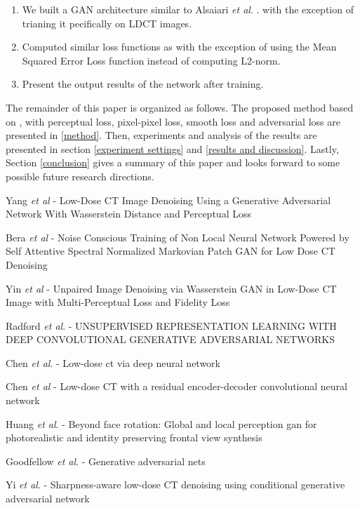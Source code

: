 \documentclass[journal]{IEEEtran}
\begin{document}
	\begin{enumerate}
		\item We built a GAN architecture similar to Alsaiari \emph{et al}. \cite{alsaiari2019image}. with the exception of trianing it pecifically on LDCT images.
		\item Computed similar loss functions as \cite{alsaiari2019image} with the exception of using the Mean Squared Error Loss function instead of computing L2-norm.
		\item Present the output results of the network after training.
	\end{enumerate}
	
	The remainder of this paper is organized as follows.  The proposed method based on \cite{alsaiari2019image}, with perceptual loss, pixel-pixel loss, smooth loss and adversarial loss are presented in \ref{method}.  Then, experiments and analysis of the results are presented in section \ref{experiment settings} and \ref{results and discussion}.  Lastly, Section \ref{conclusion} gives a summary of this paper and looks forward to some possible future research directions.


\cite{8340157} Yang \emph{et al} - Low-Dose CT Image Denoising Using a Generative Adversarial Network With Wasserstein Distance and Perceptual Loss

\cite{9474492} Bera \emph{et al} - Noise Conscious Training of Non Local Neural Network Powered by Self Attentive Spectral Normalized Markovian Patch GAN for Low Dose CT Denoising

\cite{yin2021unpaired} Yin \emph{et al} - Unpaired Image Denoising via Wasserstein GAN in Low-Dose CT Image with Multi-Perceptual Loss and Fidelity Loss

\cite{radford2015unsupervised} Radford \emph{et al}. - UNSUPERVISED REPRESENTATION LEARNING WITH DEEP CONVOLUTIONAL GENERATIVE ADVERSARIAL NETWORKS

\cite{chen2017low} Chen \emph{et al}. - Low-dose ct via deep neural network

\cite{chen2017low2} Chen \emph{et al} - Low-dose CT with a residual encoder-decoder convolutional neural network

\cite{huang2017beyond} Huang \emph{et al}. - Beyond face rotation: Global and local perception gan for photorealistic and identity preserving frontal view synthesis

\cite{goodfellow2014generative} Goodfellow \emph{et al}. - Generative adversarial nets

\cite{yi2018sharpness} Yi \emph{et al}. - Sharpness-aware low-dose CT denoising using conditional generative adversarial network
\end{document}

